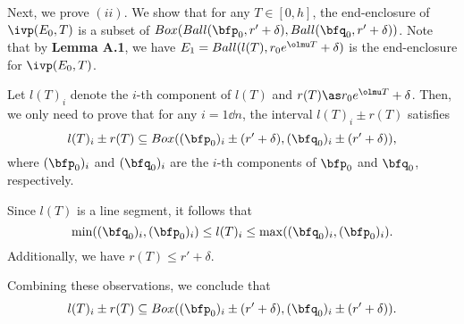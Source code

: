 		Next, we prove $(ii)$.  
		We show that for any $T \in [0, h]$,  the end-enclosure of 
		$\ivp(E_0,T)$ is a subset of $Box(Ball(\bfp_0, r' +\delta),
		Ball(\bfq_0, r' +\delta))$.
		Note that
		by {\bf Lemma A.1},
		we have $E_1 =  Ball(l(T),
		r_0e^{\olmu T}+\delta)$ is the
		end-enclosure for $\ivp(E_0, T)$.
		
		Let $l(T)_i$ denote the $i$-th component of $l(T)$ and $r(T)\as
		r_0e^{\olmu T}+\delta$. Then, we only need to
		prove that for any $i=1\dd n$, the interval $l(T)_i \pm r(T)$ satisfies  
		\[
		l(T)_i \pm r(T) \subseteq Box((\bfp_0)_i\pm (r'+\delta),
		(\bfq_0)_i\pm (r'+\delta)),
		\]  
		where $(\bfp_0)_i $ and $(\bfq_0)_i $ are the $i$-th components of
		$\bfp_0$ and $\bfq_0$,
		respectively.  
		
		Since $l(T)$ is a line segment, it follows that  
		\[
		\min((\bfq_0)_i, (\bfp_0)_i) \leq l(T)_i \leq \max((\bfq_0)_i, (\bfp_0)_i).
		\]  
		Additionally, we have $r(T) \leq r' + \delta$.  
		
		Combining these observations, we conclude that 
		\[
		l(T)_i \pm r(T) \subseteq Box((\bfp_0)_i\pm (r'+\delta),
		(\bfq_0)_i\pm (r'+\delta)).
		\] 
		
		\epf
	
